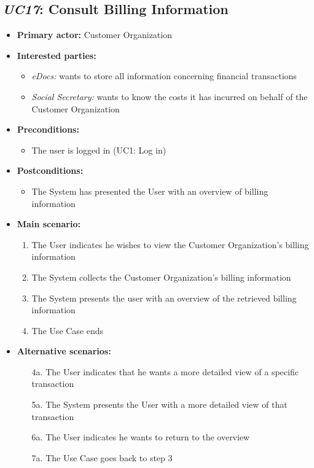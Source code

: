 \documentclass[a4paper,10pt]{article}
\begin{document}
\subsection{\emph{UC17}: Consult Billing Information}
\begin{itemize}
	\item \textbf{Primary actor:} Customer Organization
	\item \textbf{Interested parties:} 
	\begin{itemize}
		\item \textit{eDocs:} wants to store all information concerning financial transactions
		\item \textit{Social Secretary:} wants to know the costs it has incurred on behalf of the Customer Organization
	\end{itemize}
	
	\item \textbf{Preconditions:}
	\begin{itemize}
		\item The user is logged in (UC1: Log in)
	\end{itemize}
	
	\item \textbf{Postconditions:}
	\begin{itemize}
		\item The System has presented the User with an overview of billing information
	\end{itemize}
	
	\item \textbf{Main scenario:} 
	\begin{enumerate}
		\item The User indicates he wishes to view the Customer Organization's billing information
		\item The System collects the Customer Organization's billing information
		\item The System presents the user with an overview of the retrieved billing information
		\item The Use Case ends
	\end{enumerate}
	
	\item \textbf{Alternative scenarios:} 
	\begin{enumerate}
		\item [4a.] The User indicates that he wants a more detailed view of a specific transaction
		\item [5a.] The System presents the User with a more detailed view of that transaction
		\item [6a.] The User indicates he wants to return to the overview
		\item [7a.] The Use Case goes back to step 3
	\end{enumerate}
	

\end{itemize}
\end{document}
